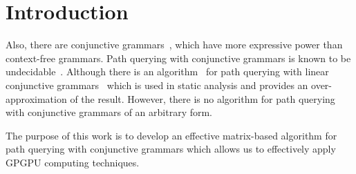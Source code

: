\section{Introduction}
Also, there are conjunctive grammars~\cite{okhotinConjAndBool}, which have more expressive power than context-free grammars. Path querying with conjunctive grammars is known to be undecidable~\cite{hellingsRelational}. Although there is an algorithm~\cite{zhang2017context} for path querying with linear conjunctive grammars~\cite{okhotinConjAndBool} which is used in static analysis and provides an over-approximation of the result. However, there is no algorithm for path querying with conjunctive grammars of an arbitrary form.

The purpose of this work is to develop an effective matrix-based algorithm
for path querying with conjunctive grammars which allows us to effectively apply GPGPU computing techniques.

